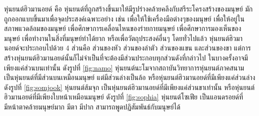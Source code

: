 หุ่นยนต์ฮิวมานอยด์ คือ หุ่นยนต์ที่ถูกสร้างขึ้นมาให้มีรูปร่างคล้ายคลึงกับสรีระโครงสร้างของมนุษย์
มักถูกออกแบบขึ้นมาเพื่อจุดประสงค์เฉพาะอย่าง เช่น เพื่อให้ใช้เครื่องมือต่างๆของมนุษย์ เพื่อให้อยู่ในสภาพแวดล้อมของมนุษย์
เพื่อศึกษาการเคลื่อนไหนของร่ายกายมนุษย์ เพื่อศึกษาการมองเห็นของมนุษย์ เพื่อทำงานในสิ่งที่มนุษย์ทำได้ยาก
หรือเพื่อวัตถุประสงค์อื่นๆ โดยทั่วไปแล้ว หุ่นยนต์ฮิวมานอยด์จะประกอบไปด้วย 4 ส่วนคือ ส่วนของหัว ส่วนของลำตัว ส่วนของแขน
และส่วนของขา แต่การสร้างหุ่นยนต์ฮิวมานอยด์นั้นก็ไม่จำเป็นที่จะต้องมีส่วนประกอบทุกส่วนดังที่กล่าวไป
ในบางครั้งอาจมีเพียงแค่ส่วนบนเท่านั้น ดังรูปที่ \ref{fig:namo} หุ่นยนต์นะโมจากสถาบันวิทยาการหุ่นยนต์ภาคสนาม
เป็นหุ่นยนต์ที่มีส่วนบนเหมือนมนุษย์ แต่มีส่วนล่างเป็นล้อ หรือหุ่นยนต์ฮิวมานอยด์ที่มีเพียงแค่ส่วนล่าง ดังรูปที่ \ref{fig:somjook}
หุ่นยนต์ส้มจุก เป็นหุ่นยนต์ฮิวมานอยด์ที่มีเพียงแค่ส่วนขาเท่านั้น หรือหุ่นยนต์ฮิวมานอยด์ที่มีเพียงใบหน้าเหมือนมนุษย์ ดังรูปที่
\ref{fig:sophia} หุ่นยนต์โซเฟีย เป็นแอนดรอยด์ที่มีหน้าตาคล้ายมนุษย์มาก มีตา มีปาก สามารถพูดปฏิสัมพันธ์กับมนุษย์ได้

